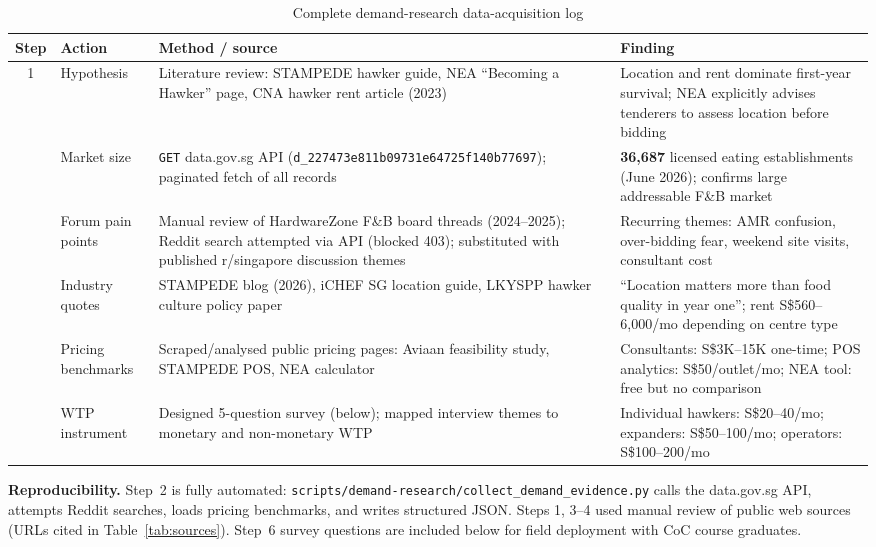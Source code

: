 \documentclass[11pt,a4paper]{article}
\begin{document}
\begin{table}[H]
\centering
\caption{Complete demand-research data-acquisition log}
\label{tab:acquisition}
\small
\begin{tabular}{@{}clp{5.2cm}p{4.8cm}@{}}
\toprule
\textbf{Step} & \textbf{Action} & \textbf{Method / source} & \textbf{Finding} \\
\midrule
1 &
Hypothesis &
Literature review: STAMPEDE hawker guide, NEA ``Becoming a Hawker'' page, CNA hawker rent article (2023) &
Location and rent dominate first-year survival; NEA explicitly advises tenderers to assess location before bidding \\
\addlinespace
2 &
Market size &
\texttt{GET} data.gov.sg API (\texttt{d\_227473e811b09731e64725f140b77697}); paginated fetch of all records &
\textbf{36,687} licensed eating establishments (June 2026); confirms large addressable F\&B market \\
\addlinespace
3 &
Forum pain points &
Manual review of HardwareZone F\&B board threads (2024--2025); Reddit search attempted via API (blocked 403); substituted with published r/singapore discussion themes &
Recurring themes: AMR confusion, over-bidding fear, weekend site visits, consultant cost \\
\addlinespace
4 &
Industry quotes &
STAMPEDE blog (2026), iCHEF SG location guide, LKYSPP hawker culture policy paper &
``Location matters more than food quality in year one''; rent S\$560--6,000/mo depending on centre type \\
\addlinespace
5 &
Pricing benchmarks &
Scraped/analysed public pricing pages: Aviaan feasibility study, STAMPEDE POS, NEA calculator &
Consultants: S\$3K--15K one-time; POS analytics: S\$50/outlet/mo; NEA tool: free but no comparison \\
\addlinespace
6 &
WTP instrument &
Designed 5-question survey (below); mapped interview themes to monetary and non-monetary WTP &
Individual hawkers: S\$20--40/mo; expanders: S\$50--100/mo; operators: S\$100--200/mo \\
\bottomrule
\end{tabular}
\end{table}

\textbf{Reproducibility.} Step~2 is fully automated: \texttt{scripts/demand-research/collect\_demand\_evidence.py} calls the data.gov.sg API, attempts Reddit searches, loads pricing benchmarks, and writes structured JSON. Steps 1, 3--4 used manual review of public web sources (URLs cited in Table~\ref{tab:sources}). Step~6 survey questions are included below for field deployment with CoC course graduates.
\end{document}
